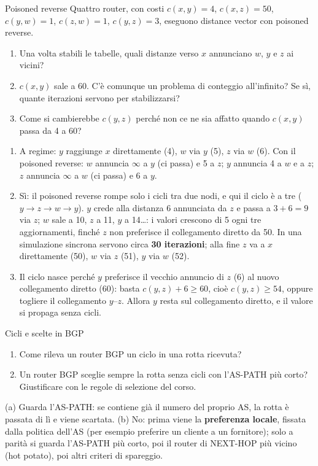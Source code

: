 \begin{esercizio}{Poisoned reverse}
Quattro router, con costi $c(x, y) = 4$, $c(x, z) = 50$, $c(y, w) = 1$, $c(z, w) = 1$, $c(y, z) = 3$, eseguono distance vector con poisoned
reverse.
\begin{enumerate}[label=(\alph*)]
    \item Una volta stabili le tabelle, quali distanze verso $x$ annunciano $w$, $y$ e $z$ ai vicini?
    \item $c(x, y)$ sale a 60. C'è comunque un problema di conteggio all'infinito? Se sì, quante iterazioni servono per stabilizzarsi?
    \item Come si cambierebbe $c(y, z)$ perché non ce ne sia affatto quando $c(x, y)$ passa da 4 a 60?
\end{enumerate}

\svolgimento
\begin{enumerate}[label=(\alph*)]
    \item A regime: $y$ raggiunge $x$ direttamente (4), $w$ via $y$ (5), $z$ via $w$ (6). Con il poisoned reverse: $w$ annuncia $\infty$ a
          $y$ (ci passa) e 5 a $z$; $y$ annuncia 4 a $w$ e a $z$; $z$ annuncia $\infty$ a $w$ (ci passa) e 6 a $y$.
    \item Sì: il poisoned reverse rompe solo i cicli tra due nodi, e qui il ciclo è a tre ($y \rightarrow z \rightarrow w \rightarrow y$).
          $y$ crede alla distanza 6 annunciata da $z$ e passa a $3 + 6 = 9$ via $z$; $w$ sale a 10, $z$ a 11, $y$ a 14\dots: i valori crescono
          di 5 ogni tre aggiornamenti, finché $z$ non preferisce il collegamento diretto da 50. In una simulazione sincrona servono circa
          \textbf{30 iterazioni}; alla fine $z$ va a $x$ direttamente (50), $w$ via $z$ (51), $y$ via $w$ (52).
    \item Il ciclo nasce perché $y$ preferisce il vecchio annuncio di $z$ (6) al nuovo collegamento diretto (60): basta $c(y, z) + 6 \geq 60$,
          cioè $c(y, z) \geq 54$, oppure togliere il collegamento $y$--$z$. Allora $y$ resta sul collegamento diretto, e il valore si propaga
          senza cicli.
\end{enumerate}
\end{esercizio}

\begin{esercizio}{Cicli e scelte in BGP}
\begin{enumerate}[label=(\alph*)]
    \item Come rileva un router BGP un ciclo in una rotta ricevuta?
    \item Un router BGP sceglie sempre la rotta senza cicli con l'AS-PATH più corto? Giustificare con le regole di selezione del corso.
\end{enumerate}

\svolgimento
(a) Guarda l'AS-PATH: se contiene già il numero del proprio AS, la rotta è passata di lì e viene scartata. (b) No: prima viene la
\textbf{preferenza locale}, fissata dalla politica dell'AS (per esempio preferire un cliente a un fornitore); solo a parità si guarda
l'AS-PATH più corto, poi il router di NEXT-HOP più vicino (hot potato), poi altri criteri di spareggio.
\end{esercizio}
